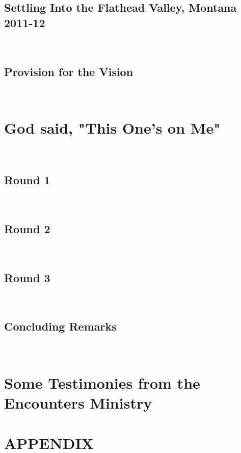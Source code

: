 \documentclass[oneside]{book}
\begin{document}
\section{Settling Into the Flathead Valley, Montana 2011-12}
\

\section{Provision for the Vision}
\

\chapter{God said, "This One's on Me"}
\

\section*{Round 1}
\

\lipsum[1]
\section{Round 2}
\

\lipsum[1]
\section{Round 3}
\

\section{Concluding Remarks}
\


\backmatter
\clearpage

\chapter*{Some Testimonies from the Encounters Ministry}
\chapter*{APPENDIX}
\end{document}
